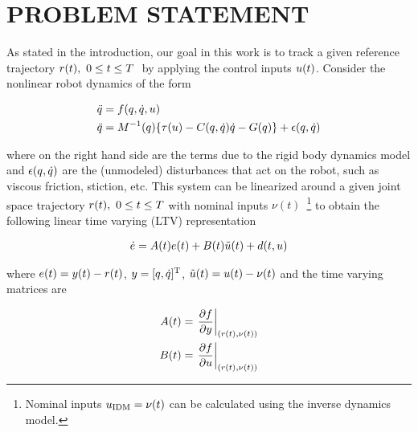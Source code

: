 \section{PROBLEM STATEMENT}\label{problemStatement}

As stated in the introduction, our goal in this work is to track a given reference trajectory $r(t), \ 0 \leq t \leq T \ $ by applying the control inputs $u(t)$. Consider the nonlinear robot dynamics of the form

\begin{equation}
\begin{aligned}
\ddot{q} &= f(q,\dot{q},u) \\
\ddot{q} &= M^{-1}(q)\{ \tau(u) - C(q,\dot{q})\dot{q} - G(q)\} + \epsilon(q,\dot{q})\\
\end{aligned}
\label{dynamics}
\end{equation}

\noindent where on the right hand side are the terms due to the rigid body dynamics model and $\epsilon(q,\dot{q})$ are the (unmodeled) disturbances that act on the robot, such as viscous friction, stiction, etc. This system can be linearized around a given joint space trajectory $r(t), \ 0 \leq t \leq T$ with nominal inputs $\nu(t)$~\footnote{Nominal inputs $u_{\mathrm{IDM}} = \nu(t)$ can be calculated using the inverse dynamics model.} to obtain the following linear time varying (LTV) representation

\begin{equation}
\begin{aligned}
\dot{e} = A(t)e(t) + B(t)\tilde{u}(t) + d(t,u)
\end{aligned}
\label{LTV}
\end{equation}

\noindent where $e(t) = y(t) - r(t)$, $y = [q,\dot{q}]^{\mathrm{T}}$, $\tilde{u}(t) = u(t) - \nu(t)$ and the time varying matrices are

\begin{equation}
\begin{aligned}
A(t) &= \left.\frac{\partial{f}}{\partial{y}}\right|_{(r(t),\nu(t))} \\
B(t) &= \left.\frac{\partial{f}}{\partial{u}}\right|_{(r(t),\nu(t))}
\end{aligned}
\label{LTVmatrices}
\end{equation}


